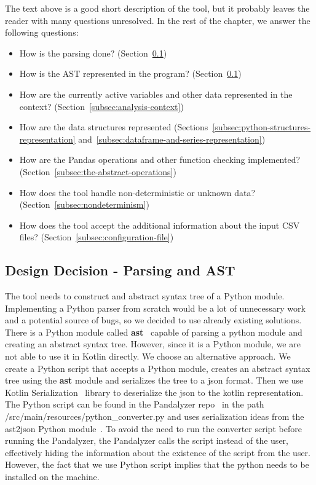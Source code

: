 The text above is a good short description of the tool, but it probably leaves the reader with many questions unresolved.
In the rest of the chapter, we answer the following questions:
\begin{itemize}
    \item How is the parsing done?
    (Section~\ref{subsec:design-decision---parsing-and-ast})
    \item How is the AST represented in the program?
    (Section~\ref{subsec:design-decision---parsing-and-ast})
    \item How are the currently active variables and other data represented in the context?
    (Section~\ref{subsec:analysis-context})
    \item How are the data structures represented
    (Sections~\ref{subsec:python-structures-representation} and~\ref{subsec:dataframe-and-series-representation})
    \item How are the Pandas operations and other function checking implemented?
    (Section~\ref{subsec:the-abstract-operations})
    \item How does the tool handle non-deterministic or unknown data?
    (Section~\ref{subsec:nondeterminism})
    \item How does the tool accept the additional information about the input CSV files?
    (Section~\ref{subsec:configuration-file})
\end{itemize}

\subsection{Design Decision - Parsing and AST}\label{subsec:design-decision---parsing-and-ast}

The tool needs to construct and abstract syntax tree of a Python module.
Implementing a Python parser from scratch would be a lot of unnecessary work and a potential source of bugs, so we
decided to use already existing solutions.
There is a Python module called \textbf{ast}~\cite{python-ast} capable of parsing a python module and creating an
abstract syntax tree.
However, since it is a Python module, we are not able to use it in Kotlin directly.
We choose an alternative approach.
We create a Python script that accepts a Python module, creates an abstract syntax tree using the \textbf{ast} module
and serializes the tree to a json format.
Then we use Kotlin Serialization~\cite{kotlin-serialization-guide} library to deserialize the json to the kotlin
representation.
The Python script can be found in the Pandalyzer repo~\cite{pandalyzer} in the path
/src/main/resources/python\_converter.py and uses serialization ideas from the ast2json Python module~\cite{ast2json}.
To avoid the need to run the converter script before running the Pandalyzer, the Pandalyzer calls the script instead of
the user, effectively hiding the information about the existence of the script from the user.
However, the fact that we use Python script implies that the python needs to be installed on the machine.

